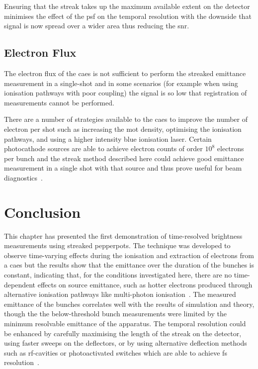 Ensuring that the streak takes up the maximum available extent on the detector minimises the effect of the \gls{psf} on the temporal resolution with the downside that signal is now spread over a wider area thus reducing the \gls{snr}.

\subsection{Electron Flux}
The electron flux of the \gls{caes} is not sufficient to perform the streaked emittance measurement in a single-shot and in some scenarios (for example when using ionisation pathways with poor coupling) the signal is so low that registration of measurements cannot be performed.

There are a number of strategies available to the \gls{caes} to improve the number of electron per shot such as increasing the \gls{mot} density, optimising the ionisation pathways, and using a higher intensity blue ionisation laser.
Certain photocathode sources are able to achieve electron counts of order $10^8$ electrons per bunch and the streak method described here could achieve good emittance measurement in a single shot with that source and thus prove useful for beam diagnostics~\cite{li_note:_2010,musumeci_high_2010}.

\section{Conclusion}
This chapter has presented the first demonstration of time-resolved brightness measurements using streaked pepperpots.
The technique was developed to observe time-varying effects during the ionisation and extraction of electrons from a \gls{caes} but the results show that the emittance over the duration of the bunches is constant, indicating that, for the conditions investigated here, there are no time-dependent effects on source emittance, such as hotter electrons produced through alternative ionisation pathways like multi-photon ionisation~\cite{speirs_identification_2017}.
The measured emittance of the bunches correlates well with the results of simulation and theory, though the the below-threshold bunch measurements were limited by the minimum resolvable emittance of the apparatus.
The temporal resolution could be enhanced by carefully maximising the length of the streak on the detector, using faster sweeps on the deflectors, or by using alternative deflection methods such as rf-cavities or photoactivated switches which are able to achieve \unit[100]{fs} resolution~\cite{li_note:_2010,kassier_compact_2010,van_rens_theory_2018}.

